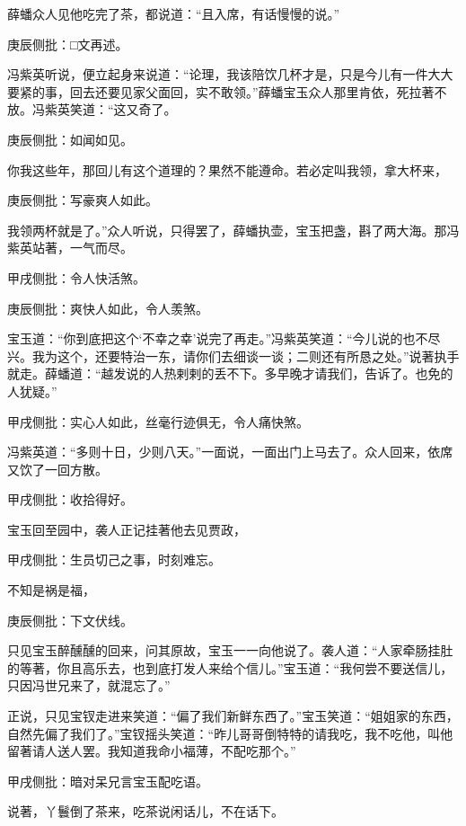 \begin{parag}
    薛蟠众人见他吃完了茶，都说道：“且入席，有话慢慢的说。”\begin{note}庚辰侧批：□文再述。\end{note}冯紫英听说，便立起身来说道：“论理，我该陪饮几杯才是，只是今儿有一件大大要紧的事，回去还要见家父面回，实不敢领。”薛蟠宝玉众人那里肯依，死拉著不放。冯紫英笑道：“这又奇了。\begin{note}庚辰侧批：如闻如见。\end{note}你我这些年，那回儿有这个道理的？果然不能遵命。若必定叫我领，拿大杯来，\begin{note}庚辰侧批：写豪爽人如此。\end{note}我领两杯就是了。”众人听说，只得罢了，薛蟠执壶，宝玉把盏，斟了两大海。那冯紫英站著，一气而尽。\begin{note}甲戌侧批：令人快活煞。\end{note}\begin{note}庚辰侧批：爽快人如此，令人羡煞。\end{note}宝玉道：“你到底把这个‘不幸之幸’说完了再走。”冯紫英笑道：“今儿说的也不尽兴。我为这个，还要特治一东，请你们去细谈一谈；二则还有所恳之处。”说著执手就走。薛蟠道：“越发说的人热剌剌的丢不下。多早晚才请我们，告诉了。也免的人犹疑。”\begin{note}甲戌侧批：实心人如此，丝毫行迹俱无，令人痛快煞。\end{note}冯紫英道：“多则十日，少则八天。”一面说，一面出门上马去了。众人回来，依席又饮了一回方散。\begin{note}甲戌侧批：收拾得好。\end{note}
\end{parag}


\begin{parag}
    宝玉回至园中，袭人正记挂著他去见贾政，\begin{note}甲戌侧批：生员切己之事，时刻难忘。\end{note}不知是祸是福，\begin{note}庚辰侧批：下文伏线。\end{note}只见宝玉醉醺醺的回来，问其原故，宝玉一一向他说了。袭人道：“人家牵肠挂肚的等著，你且高乐去，也到底打发人来给个信儿。”宝玉道：“我何尝不要送信儿，只因冯世兄来了，就混忘了。”
\end{parag}


\begin{parag}
    正说，只见宝钗走进来笑道：“偏了我们新鲜东西了。”宝玉笑道：“姐姐家的东西，自然先偏了我们了。”宝钗摇头笑道：“昨儿哥哥倒特特的请我吃，我不吃他，叫他留著请人送人罢。我知道我命小福薄，不配吃那个。”\begin{note}甲戌侧批：暗对呆兄言宝玉配吃语。\end{note}说著，丫鬟倒了茶来，吃茶说闲话儿，不在话下。
\end{parag}


